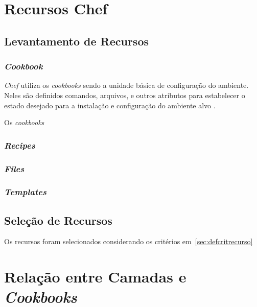 \section{Recursos Chef}

\subsection{Levantamento de Recursos}

\subsubsection{\textit{Cookbook}}

\textit{Chef} utiliza os \textit{cookbooks} sendo a unidade básica de configuração do
ambiente. Neles são definidos comandos, arquivos, e outros atributos
para estabelecer o estado desejado para a instalação e configuração
do ambiente alvo \cite{sharma:2015}.

Os \textit{cookbooks} 


\subsubsection{\textit{Recipes}}
\subsubsection{\textit{Files}}
\subsubsection{\textit{Templates}}


\subsection{Seleção de Recursos}
Os recursos foram selecionados considerando os critérios em~\ref{sec:defcritrecurso}



\section{Relação entre Camadas e \textit{Cookbooks}}


